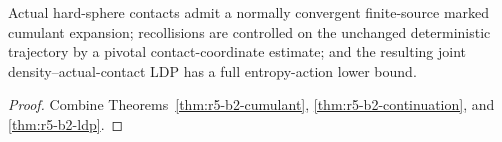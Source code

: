 \begin{theorem}
\label{thm:r5-b2-main}
Actual hard-sphere contacts admit a normally convergent finite-source marked
cumulant expansion; recollisions are controlled on the unchanged deterministic
trajectory by a pivotal contact-coordinate estimate; and the resulting joint
density--actual-contact LDP has a full entropy-action lower bound.
\end{theorem}

\begin{proof}
Combine Theorems~\ref{thm:r5-b2-cumulant},
\ref{thm:r5-b2-continuation}, and
\ref{thm:r5-b2-ldp}.
\end{proof}
